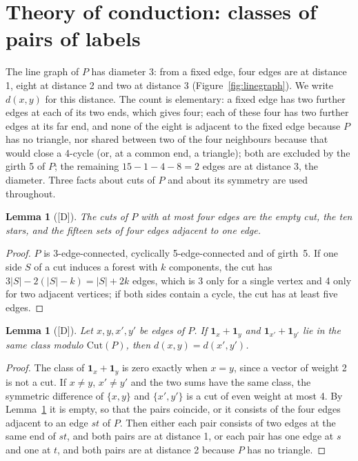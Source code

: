 \documentclass[11pt]{article}
\newtheorem{lemma}[theorem]{Lemma}
\theoremstyle{definition}
\theoremstyle{remark}
\newcommand{\PG}{P}
\newcommand{\Cut}{\mathrm{Cut}}
\newcommand{\claim}[1]{\textup{[#1]}}
\begin{document}
\section{Theory of conduction: classes of pairs of labels}\label{sec:classes}

The line graph of $\PG$ has diameter 3: from a fixed edge, four edges are at distance 1, eight at
distance 2 and two at distance 3 (Figure~\ref{fig:linegraph}). We write $d(x, y)$ for this distance. The count is
elementary: a fixed edge has two further edges at each of its two ends, which gives four; each of these four has two further edges at its far end,
and none of the eight is adjacent to the fixed edge because $\PG$ has no triangle, nor shared between two of the four neighbours because that would close a 4-cycle (or, at a common end, a triangle); both are excluded by the girth 5 of $\PG$;
the remaining $15 - 1 - 4 - 8 = 2$ edges are at distance 3, the diameter.
Three facts about cuts of $\PG$ and about its symmetry are used throughout.

\begin{lemma}[\claim{D}]\label{lem:smallcuts}
The cuts of $\PG$ with at most four edges are the empty cut, the ten stars, and the fifteen sets of
four edges adjacent to one edge.
\end{lemma}

\begin{proof}
$\PG$ is 3-edge-connected, cyclically 5-edge-connected and of girth~5. If one side $S$ of a cut
induces a forest with $k$ components, the cut has $3|S| - 2(|S| - k) = |S| + 2k$ edges, which is 3
only for a single vertex and 4 only for two adjacent vertices; if both sides contain a cycle, the
cut has at least five edges.
\end{proof}

\begin{lemma}[\claim{D}]\label{lem:distance}
Let $x, y, x', y'$ be edges of $\PG$. If $\mathbf{1}_x + \mathbf{1}_y$ and $\mathbf{1}_{x'} +
\mathbf{1}_{y'}$ lie in the same class modulo $\Cut(\PG)$, then $d(x, y) = d(x', y')$.
\end{lemma}

\begin{proof}
The class of $\mathbf{1}_x + \mathbf{1}_y$ is zero exactly when $x = y$, since a vector of weight 2
is not a cut. If $x \ne y$, $x' \ne y'$ and the two sums have the same class, the symmetric
difference of $\{x, y\}$ and $\{x', y'\}$ is a cut of even weight at most 4. By
Lemma~\ref{lem:smallcuts} it is empty, so that the pairs coincide, or it consists of the four
edges adjacent to an edge $st$ of $\PG$. Then either each pair consists of two edges at the same
end of $st$, and both pairs are at distance 1, or each pair has one edge at $s$ and one at $t$,
and both pairs are at distance 2 because $\PG$ has no triangle.
\end{proof}
\end{document}
